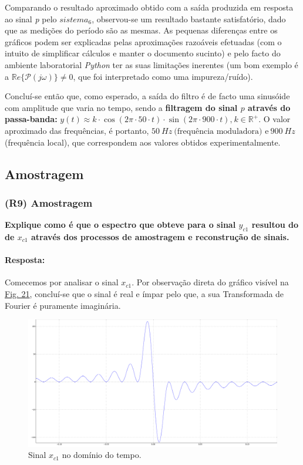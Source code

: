 Comparando o resultado aproximado obtido com a saída produzida em resposta ao sinal \textit{p} pelo \(sistema_6\), observou-se um resultado bastante satisfatório, dado que as medições do período são as mesmas. As pequenas diferenças entre os gráficos podem ser explicadas pelas aproximações razoáveis efetuadas (com o intuito de simplificar cálculos e manter o documento sucinto) e pelo facto do ambiente laboratorial \textit{Python} ter as suas limitações inerentes (um bom exemplo é a \(\mathbb{R}e\{\mathcal{P}(j\omega)\} \neq 0\), que foi interpretado como uma impureza/ruído).

Concluí-se então que, como esperado, a saída do filtro é de facto uma sinusóide com amplitude que varia no tempo, sendo a \textbf{filtragem do sinal \(p\) através do passa-banda:} \(y(t) \approx k \cdot \cos (2\pi \cdot 50 \cdot t) \cdot \sin (2 \pi \cdot 900 \cdot t)\text{,}\ k \in \mathbb{R}^{+}\). O valor aproximado das frequências, é portanto, \(50\ Hz\ \text{(frequência moduladora) e}\ 900\ Hz\) (frequência local), que correspondem aos valores obtidos experimentalmente.

\clearpage

\subsection{\bf{Amostragem}}
\label{subsec:amostragem}
\subsubsection{(R9) Amostragem}
\label{subsubsec:R9}
\textbf{Explique como é que o espectro que obteve para o sinal \(y_{c1}\) resultou do de \(x_{c1}\) através dos processos de amostragem e reconstrução de sinais.}
\paragraph{Resposta:} %
Comecemos por analisar o sinal \(x_{c1}\). Por observação direta do gráfico visível na \hyperref[fig:xc1]{Fig. 21}, concluí-se que o sinal é real e ímpar pelo que, a sua Transformada de Fourier é puramente imaginária\footnotemark[8].

\begin{figure}[ht]
    \centering
    \includegraphics[width = 0.5\linewidth]{prints/xc1.png}   
    \caption{Sinal \(x_{c1}\) no domínio do tempo.}
    \label{fig:xc1}
\end{figure}

